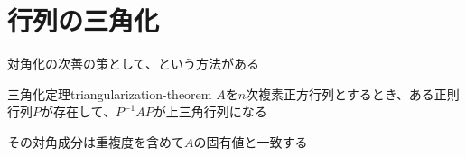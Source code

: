 \documentclass[../../../topic_linear-algebra]{subfiles}
\begin{document}
\sectionline
\section{行列の三角化}

対角化の次善の策として、という方法がある

\begin{theorem}{三角化定理}{triangularization-theorem}
  $A$を$n$次複素正方行列とするとき、ある正則行列$P$が存在して、$P^{-1}AP$が上三角行列になる

  その対角成分は重複度を含めて$A$の固有値と一致する
\end{theorem}
\end{document}
